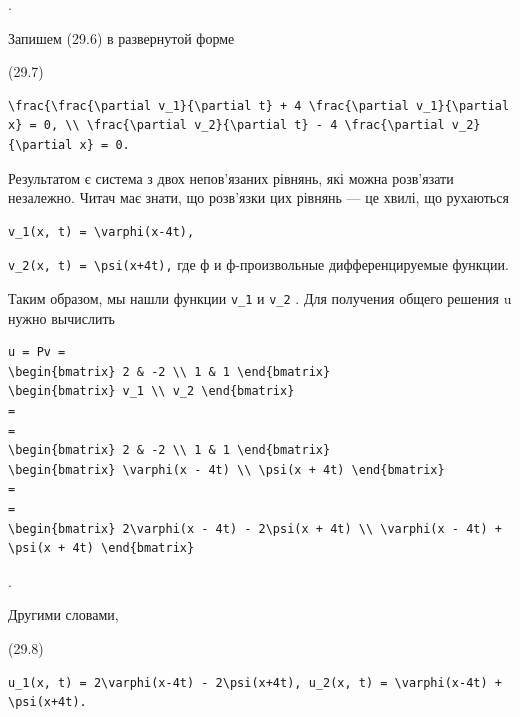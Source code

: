 \documentclass[
  ukrainian,
]{article}
\begin{document}
.

Запишем (29.6) в развернутой форме

(29.7)

\begin{verbatim}
\frac{\frac{\partial v_1}{\partial t} + 4 \frac{\partial v_1}{\partial x} = 0, \\ \frac{\partial v_2}{\partial t} - 4 \frac{\partial v_2}{\partial x} = 0.
\end{verbatim}

Результатом є система з двох непов'язаних рівнянь, які можна розв'язати
незалежно. Читач має знати, що розв'язки цих рівнянь --- це хвилі, що
рухаються

\begin{verbatim}
v_1(x, t) = \varphi(x-4t),
\end{verbatim}

\texttt{v\_2(x,\ t)\ =\ \textbackslash{}psi(x+4t),} где ф и
ф-произвольные дифференцируемые функции.

Таким образом, мы нашли функции \texttt{v\_1} и \texttt{v\_2} . Для
получения общего решения u нужно вычислить

\begin{verbatim}
u = Pv =
\begin{bmatrix} 2 & -2 \\ 1 & 1 \end{bmatrix}
\begin{bmatrix} v_1 \\ v_2 \end{bmatrix}
=
=
\begin{bmatrix} 2 & -2 \\ 1 & 1 \end{bmatrix}
\begin{bmatrix} \varphi(x - 4t) \\ \psi(x + 4t) \end{bmatrix}
=
=
\begin{bmatrix} 2\varphi(x - 4t) - 2\psi(x + 4t) \\ \varphi(x - 4t) + \psi(x + 4t) \end{bmatrix}
\end{verbatim}

.

Другими словами,

(29.8)

\begin{verbatim}
u_1(x, t) = 2\varphi(x-4t) - 2\psi(x+4t), u_2(x, t) = \varphi(x-4t) + \psi(x+4t).
\end{verbatim}
\end{document}
